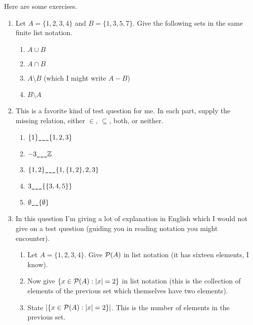 \documentclass[12pt]{article}
\begin{document}
\begin{description}
Here are some exercises.

\begin{enumerate}

\item  Let $A = \{1,2,3,4\}$ and $B = \{1,3,5,7\}$.  Give the following sets in the same finite list notation. 

\begin{enumerate}

\item $A \cup B$

\item $A \cap B$

\item $A \setminus B$ (which I might write $A-B$)

\item $B \setminus A$

\end{enumerate}  

\item This is a favorite kind of test question for me.  In each part, supply the missing relation, either $\in$, $\subseteq$, both, or neither.
\begin{enumerate}
\item  $\{1\} \verb|___| \{1,2,3\}$

\item  $-3 \verb|___| \mathbb Z$

\item  $\{1,2\} \verb|___| \{1,\{1,2\},2,3\}$

\item  $3 \verb|___| \{\{3,4,5\}\}$

\item $\emptyset \verb|__| \{\emptyset\}$
\end{enumerate}

\item   In this question I'm giving a lot of explanation in English which I would not give on a test question (guiding you in reading notation you might encounter).
\begin{enumerate}
\item Let $A=\{1,2,3,4\}$.  Give ${\cal P}(A)$ in list notation (it has sixteen elements, I know).

\item Now give $\{x \in {\cal P}(A):|x|=2\}$ in list notation (this is the collection of elements of the previous set which themselves have two elements).

\item State  $|\{x \in {\cal P}(A):|x|=2\}|$.  This is the number of elements in the previous set.


\end{enumerate}
\end{enumerate}
\end{description}
\end{document}
